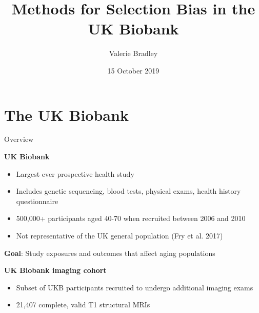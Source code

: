 \documentclass[
  ignorenonframetext,
]{beamer}
\institute[University of Oxford]{University of Oxford, Department of Statistics}
\title{Methods for Selection Bias in the UK Biobank}
\author{Valerie Bradley}
\date{15 October 2019}
\providecommand{\tightlist}{%
  \setlength{\itemsep}{0pt}\setlength{\parskip}{0pt}}
\begin{document}
\frame{\titlepage}

\begin{frame}
  \tableofcontents[hideallsubsections]
\end{frame}
\hypertarget{the-uk-biobank}{%
\section{The UK Biobank}\label{the-uk-biobank}}

\begin{frame}{Overview}
\protect\hypertarget{overview}{}

\textbf{UK Biobank}

\begin{itemize}
\tightlist
\item
  Largest ever prospective health study
\item
  Includes genetic sequencing, blood tests, physical exams, health
  history questionnaire
\item
  500,000+ participants aged 40-70 when recruited between 2006 and 2010
\item
  Not representative of the UK general population (Fry et al. 2017)
\end{itemize}

\textbf{Goal}: Study exposures and outcomes that affect aging
populations

\textbf{UK Biobank imaging cohort}

\begin{itemize}
\tightlist
\item
  Subset of UKB participants recruited to undergo additional imaging
  exams
\item
  21,407 complete, valid T1 structural MRIs
\end{itemize}

\end{frame}
\end{document}
